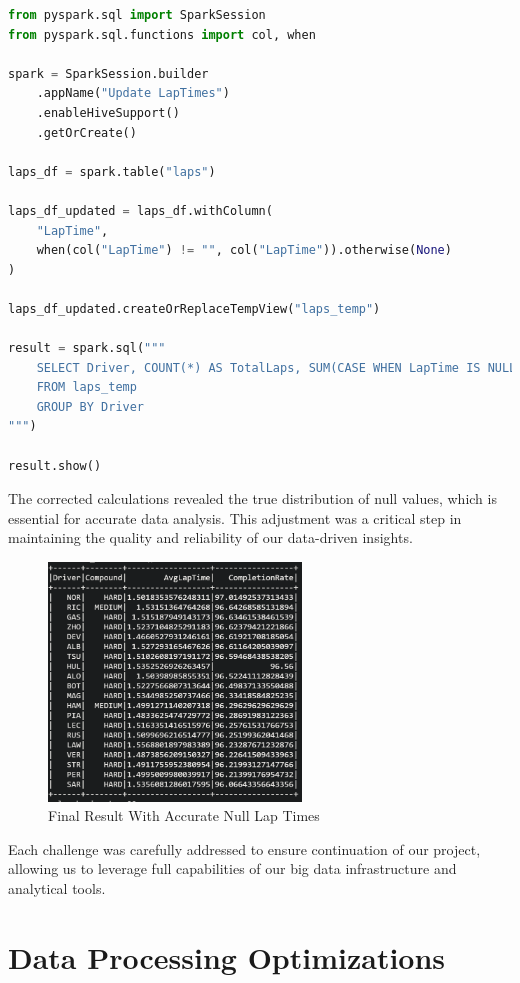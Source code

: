 \documentclass{article}
\begin{document}
\begin{lstlisting}[language=Python]
from pyspark.sql import SparkSession
from pyspark.sql.functions import col, when

spark = SparkSession.builder
    .appName("Update LapTimes")
    .enableHiveSupport()
    .getOrCreate()

laps_df = spark.table("laps")

laps_df_updated = laps_df.withColumn(
    "LapTime",
    when(col("LapTime") != "", col("LapTime")).otherwise(None)
)

laps_df_updated.createOrReplaceTempView("laps_temp")

result = spark.sql("""
    SELECT Driver, COUNT(*) AS TotalLaps, SUM(CASE WHEN LapTime IS NULL THEN 1 ELSE 0 END) AS NullLapTimes
    FROM laps_temp
    GROUP BY Driver
""")

result.show()
\end{lstlisting}

The corrected calculations revealed the true distribution of null values, which is essential for accurate data analysis. This adjustment was a critical step in maintaining the quality and reliability of our data-driven insights.

\begin{figure}[H]
    \centering
    \includegraphics[width=0.6\textwidth]{solved-nulls.png}
    \caption{Final Result With Accurate Null Lap Times}
\end{figure}


Each challenge was carefully addressed to ensure continuation of our project, allowing us to leverage full capabilities of our big data infrastructure and analytical tools.

\section{Data Processing Optimizations}
\end{document}
